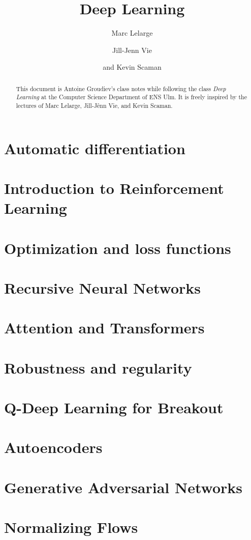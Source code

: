 \documentclass[toc, titlepaged]{../cs-classes/cs-classes}
\title{Deep Learning}
\author{Marc Lelarge\and Jill-Jenn Vie\and and Kevin Scaman}
\begin{document}
\begin{abstract}
    This document is Antoine Groudiev's class notes while following the class \emph{Deep Learning} at the Computer Science Department of ENS Ulm. It is freely inspired by the lectures of Marc Lelarge, Jill-Jênn Vie, and Kevin Scaman. 
\end{abstract}



\section{Automatic differentiation}

\section{Introduction to Reinforcement Learning}

\section{Optimization and loss functions}

\newpage

\newpage

\section{Recursive Neural Networks}

\section{Attention and Transformers}

\section{Robustness and regularity}

\section{Q-Deep Learning for Breakout}

\section{Autoencoders}

\section{Generative Adversarial Networks}

\section{Normalizing Flows}
\end{document}
